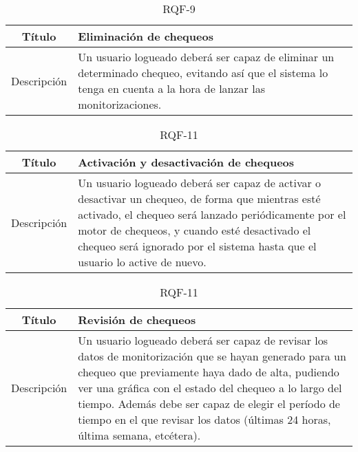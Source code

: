 \begin{table}[h!]
  \centering
  \begin{tabularx}{\textwidth}{|c|X|}
    \hline
    Título & Eliminación de chequeos \\

    \hline

    Descripción & Un usuario logueado deberá ser capaz de eliminar un
    determinado chequeo, evitando así que el sistema lo tenga en cuenta a la
    hora de lanzar las monitorizaciones. \\

    \hline
  \end{tabularx}
  \caption{RQF-9}
\end{table}

\begin{table}[h!]
  \centering
  \begin{tabularx}{\textwidth}{|c|X|}
    \hline
    Título & Activación y desactivación de chequeos \\

    \hline

    Descripción & Un usuario logueado deberá ser capaz de activar o desactivar
    un chequeo, de forma que mientras esté activado, el chequeo será lanzado
    periódicamente por el motor de chequeos, y cuando esté desactivado el
    chequeo será ignorado por el sistema hasta que el usuario lo active de
    nuevo. \\

    \hline
  \end{tabularx}
  \caption{RQF-11}
\end{table}

\begin{table}[h!]
  \centering
  \begin{tabularx}{\textwidth}{|c|X|}
    \hline
    Título & Revisión de chequeos \\

    \hline

    Descripción & Un usuario logueado deberá ser capaz de revisar los datos de
    monitorización que se hayan generado para un chequeo que previamente haya
    dado de alta, pudiendo ver una gráfica con el estado del chequeo a lo largo
    del tiempo. Además debe ser capaz de elegir el período de tiempo en el que
    revisar los datos (últimas 24 horas, última semana, etcétera). \\

    \hline
  \end{tabularx}
  \caption{RQF-11}
\end{table}



